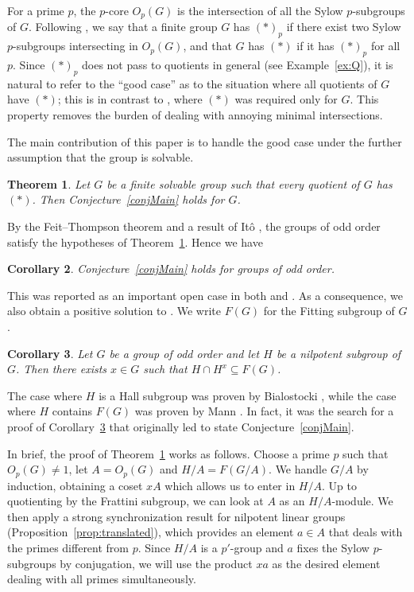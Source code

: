 \documentclass[11pt]{amsart}
\numberwithin{equation}{section}
\newtheorem{theorem}{Theorem}[section]
\newtheorem{corollary}[theorem]{Corollary}
\theoremstyle{definition}
\theoremstyle{remark}
\begin{document}
For a prime $p$, the $p$-core $O_p(G)$ is the intersection of all the Sylow $p$-subgroups of $G$.
Following \cite{LS26}, we say that a finite group $G$ has $(*)_p$
if there exist two Sylow $p$-subgroups intersecting in $O_p(G)$,
and that $G$ has $(*)$ if it has $(*)_p$ for all $p$.
Since $(*)_p$ does not pass to quotients in general (see Example~\ref{ex:Q}),
it is natural to refer to the ``good case''
as to the situation where all quotients of $G$ have $(*)$;
this is in contrast to \cite[Conjecture~B]{LS26}, where $(*)$ was required only for $G$.
This property removes the burden of dealing with annoying minimal intersections.

The main contribution of this paper is to handle the good case
under the further assumption that the group is solvable.

\begin{theorem} \label{thMain}
Let $G$ be a finite solvable group such that every quotient of $G$ has $(*)$.
Then Conjecture~\ref{conjMain} holds for $G$.
\end{theorem}

By the Feit--Thompson theorem \cite{FT63} and a result of It\^o \cite{Ito58},
the groups of odd order satisfy the hypotheses of Theorem~\ref{thMain}.
Hence we have

\begin{corollary} \label{corOdd}
Conjecture~\ref{conjMain} holds for groups of odd order.
\end{corollary}

This was reported as an important open case in both \cite{LS26} and \cite{BH26}.
As a consequence, we also obtain a positive solution to \cite[Conjecture~C]{LS26}.
We write $F(G)$ for the Fitting subgroup of $G$.

\begin{corollary} \label{corBiaMan}
Let $G$ be a group of odd order and let $H$ be a nilpotent subgroup of $G$.
Then there exists $x \in G$ such that $H \cap H^x \subseteq F(G)$.
\end{corollary}

The case where $H$ is a Hall subgroup was proven by Bialostocki \cite[Theorem~B.4]{Bia75},
while the case where $H$ contains $F(G)$ was proven by Mann \cite[page~263]{Man75}.
In fact, it was the search for a proof of Corollary~\ref{corBiaMan}
that originally led to state Conjecture~\ref{conjMain}.

In brief, the proof of Theorem~\ref{thMain} works as follows.
Choose a prime $p$ such that $O_p(G) \neq 1$, let $A=O_p(G)$ and $H/A = F(G/A)$.
We handle $G/A$ by induction, obtaining a coset $xA$ which allows us to enter in $H/A$.
Up to quotienting by the Frattini subgroup, we can look at $A$ as an $H/A$-module.
We then apply a strong synchronization result
for nilpotent linear groups (Proposition~\ref{prop:translated}),
which provides an element
$a \in A$ that deals with the primes different from $p$.
Since $H/A$ is a $p'$-group and $a$ fixes the Sylow $p$-subgroups by conjugation,
we will use the product $xa$ as the desired element dealing with all primes simultaneously.
\end{document}

